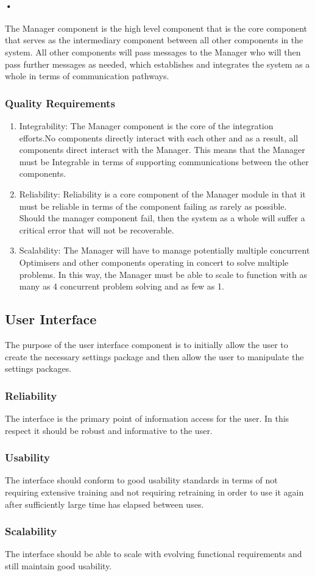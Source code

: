 \documentclass[11pt]{article}
\begin{document}
\paragraph{•}
The Manager component is the high level component that is the core component that serves as the intermediary component between all other components in the system. All other components will pass messages to the Manager who will then pass further messages as needed, which establishes and integrates the system as a whole in terms of communication pathways.
\subsubsection{Quality Requirements}
\begin{enumerate}
\item Integrability: The Manager component is the core of the integration efforts.No components directly interact with each other and as a result, all components direct interact with the Manager. This means that the Manager must be Integrable in terms of supporting communications between the other components.
\item Reliability: Reliability is a core component of the Manager module in that it must be reliable in terms of the component failing as rarely as possible. Should the manager component fail, then the system as a whole will suffer a critical error that will not be recoverable.
\item Scalability: The Manager will have to manage potentially multiple concurrent Optimisers and other components operating in concert to solve multiple problems. In this way, the Manager must be able to scale to function with as many as 4 concurrent problem solving and as few as 1.
\end{enumerate}

\subsection{User Interface}
The purpose of the user interface component is to initially allow the user to create the necessary settings package and then allow the user to manipulate the settings packages.
\subsubsection{Reliability}
The interface is the primary point of information access for the user. In this respect it should be robust and informative to the user.
\subsubsection{Usability}
The interface should conform to good usability standards in terms of not requiring extensive training and not requiring retraining in order to use it again after sufficiently large time has elapsed between uses.
\subsubsection{Scalability}
The interface should be able to scale with evolving functional requirements and still maintain good usability. 
\end{document}
